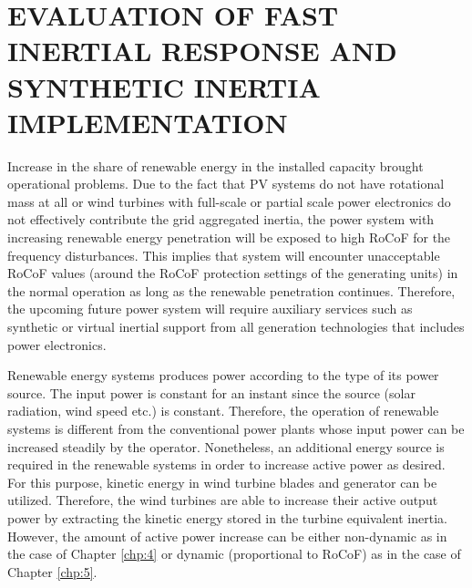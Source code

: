 \chapter{EVALUATION OF FAST INERTIAL RESPONSE AND SYNTHETIC INERTIA IMPLEMENTATION}
\label{chp:6}
Increase in the share of renewable energy in the installed capacity brought operational problems. Due to the fact that PV systems do not have rotational mass at all or wind turbines with full-scale or partial scale power electronics do not effectively contribute the grid aggregated inertia, the power system with increasing renewable energy penetration will be exposed to high RoCoF for the frequency disturbances. This implies that system will encounter unacceptable RoCoF values (around the RoCoF protection settings of the generating units) in the normal operation as long as the renewable penetration continues. Therefore, the upcoming future power system will require auxiliary services such as synthetic or virtual inertial support from all generation technologies that includes power electronics. \par
Renewable energy systems produces power according to the type of its power source. The input power is constant for an instant since the source (solar radiation, wind speed etc.) is constant. Therefore, the operation of renewable systems is different from the conventional power plants whose input power can be increased steadily by the operator. Nonetheless, an additional energy source is required in the renewable systems in order to increase active power as desired. For this purpose, kinetic energy in wind turbine blades and generator can be utilized. Therefore, the wind turbines are able to increase their active output power by extracting the kinetic energy stored in the turbine equivalent inertia. However, the amount of active power increase can be either non-dynamic as in the case of Chapter \ref{chp:4} or dynamic (proportional to RoCoF) as in the case of Chapter \ref{chp:5}.
